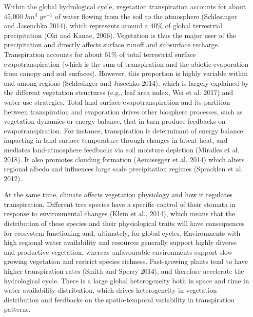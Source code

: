 \documentclass[11pt,twoside]{reedthesis}
\begin{document}
Within the global hydrological cycle, vegetation transpiration accounts
for about 45,000 \(km^3\) \(yr^{-1}\) of water flowing from the soil to
the atmosphere (Schlesinger and Jasenchko 2014), which represents around
a 40\% of global terrestrial precipitation (Oki and Kanae, 2006).
Vegetation is thus the major user of the precipitation and directly
affects surface runoff and subsurface recharge. Transpiration accounts
for about 61\% of total terrestrial surface evapotranspiration (which is
the sum of transpiration and the abiotic evaporation from canopy and
soil surfaces). However, this proportion is highly variable within and
among regions (Schlesinger and Jasechko 2014), which is largely
explained by the different vegetation structures (e.g., leaf area index,
Wei et al. 2017) and water use strategies. Total land surface
evapotranspiration and its partition between transpiration and
evaporation drives other biosphere processes, such as vegetation
dynamics or energy balance, that in turn produce feedbacks on
evapotranspiration. For instance, transpiration is determinant of energy
balance impacting in land surface temperature through changes in latent
heat, and mediates land-atmosphere feedbacks via soil moisture depletion
(Miralles et al. 2018). It also promotes clouding formation (Aemisegger
et al. 2014) which alters regional albedo and influences large scale
precipitation regimes (Spracklen et al. 2012).\par

At the same time, climate affects vegetation physiology and how it
regulates transpiration. Different tree species have a specific control
of their stomata in response to environmental changes (Klein et al.,
2014), which means that the distribution of these species and their
physiological traits will have consequences for ecosystem functioning
and, ultimately, for global cycles. Environments with high regional
water availability and resources generally support highly diverse and
productive vegetation, whereas unfavourable environments support
slow-growing vegetation and restrict species richness. Fast-growing
plants tend to have higher transpiration rates (Smith and Sperry 2014),
and therefore accelerate the hydrological cycle. There is a large global
heterogeneity both in space and time in water availability distribution,
which drives heterogeneity in vegetation distribution and feedbacks on
the spatio-temporal variability in transpiration patterns.\par
\end{document}
